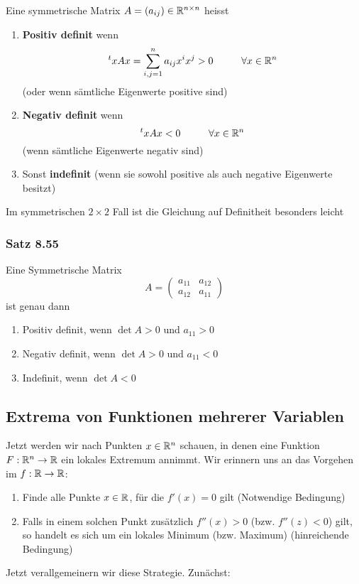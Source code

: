 \begin{definition}{8.54}
Eine symmetrische Matrix $A=\left( a_{ij}\right)\in\mathbb{R}^{n\times n}$ heisst
\begin{enumerate}
\item \textbf{Positiv definit} wenn \[{}^txAx = \sum\limits_{i,j = 1}^n {{a_{ij}}{x^i}{x^j} > 0}\hspace{10mm}\forall x\in\R^n\] (oder wenn sämtliche Eigenwerte positive sind)
\item \textbf{Negativ definit} wenn \[{}^txAx < 0\hspace{10mm}\forall x\in\R^n\] (wenn sämtliche Eigenwerte negativ sind)
\item Sonst \textbf{indefinit} (wenn sie sowohl positive als auch negative Eigenwerte besitzt)
\end{enumerate}
Im symmetrischen $2\times 2$ Fall ist die Gleichung auf Definitheit besonders leicht
\end{definition}

\subsubsection*{Satz 8.55}
Eine Symmetrische Matrix
\[A = \left( {\begin{array}{*{20}{c}}
{{a_{11}}}&{{a_{12}}}\\
{{a_{12}}}&{{a_{11}}}
\end{array}} \right)\]
ist genau dann
\begin{enumerate}
\item Positiv definit, wenn $\det A>0$ und $a_{11}>0$
\item Negativ definit, wenn $\det A>0$ und $a_{11}<0$
\item Indefinit, wenn $\det A<0$
\end{enumerate}

\subsection*{Extrema von Funktionen mehrerer Variablen}
Jetzt werden wir nach Punkten $x\in\mathbb{R}^n$ schauen, in denen eine Funktion $F:\mathbb{R}^n\to\mathbb{R}$ ein lokales Extremum annimmt. Wir erinnern uns an das Vorgehen im $f:\mathbb{R}\to\mathbb{R}$:
\begin{enumerate}
\item Finde alle Punkte $x\in\mathbb{R}$, für die $f'(x)=0$ gilt (Notwendige Bedingung)
\item Falls in einem solchen Punkt zusätzlich $f''(x)>0$ (bzw. $f''(z)<0$) gilt, so handelt es sich um ein lokales Minimum (bzw. Maximum) (hinreichende Bedingung)
\end{enumerate}
Jetzt verallgemeinern wir diese Strategie. Zunächst:

